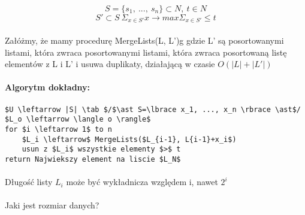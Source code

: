 $$S=\lbrace s_1,\ ...,\ s_n \rbrace \subset N,\ t\in N$$
$$S'\subset S\ \Sigma_{x\in S'}x \rightarrow max\Sigma_{x\in S'}\leq t$$
\paragraph{}{Załóżmy, że mamy procedurę MergeLists(L, L')g gdzie L' są posortowanymi listami, która zwraca posortowanymi listami, która zwraca posortowaną listę elementów z L i L' i usuwa duplikaty, działającą w czasie $O(|L|+|L'|)$}
\paragraph{Algorytm dokładny:}
\begin{lstlisting}[caption={ExactSubsetSum(S,t)}]
$U \leftarrow |S| \tab $/$\ast S=\lbrace x_1, ..., x_n \rbrace \ast$/
$L_o \leftarrow \langle o \rangle$
for $i \leftarrow 1$ to n
	$L_i \leftarrow$ MergeLists($L_{i-1}, L{i-1}+x_i$)
	usun z $L_i$ wszystkie elementy $>$ t
return Najwiekszy element na liscie $L_N$
\end{lstlisting}
\paragraph{}{Długość listy $L_i$ może być wykładnicza względem i, nawet $2^i$}
\paragraph{}{Jaki jest rozmiar danych?}
